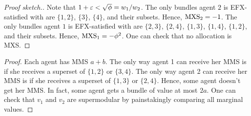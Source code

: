 \begin{proof}[Proof sketch.]
Note that $1 + \varepsilon < \sqrt{\phi} = w_1/w_2$.
The only bundles agent $2$ is EFX-satisfied with are
$\{1, 2\}$, $\{3\}$, $\{4\}$, and their subsets.
Hence, $\mathrm{MXS}_2 = -1$.
%
The only bundles agent $1$ is EFX-satisfied with are
$\{2, 3\}$, $\{2, 4\}$, $\{1, 3\}$, $\{1, 4\}$, $\{1, 2\}$, and their subsets.
Hence, $\mathrm{MXS}_1 = -\phi^2$.
%
One can check that no allocation is MXS.
\end{proof}

\begin{proof}
Each agent has MMS $a+b$.
The only way agent 1 can receive her MMS is if she receives a superset of $\{1, 2\}$ or $\{3, 4\}$.
The only way agent 2 can receive her MMS is if she receives a superset of $\{1, 3\}$ or $\{2, 4\}$.
Hence, some agent doesn't get her MMS. In fact, some agent gets a bundle of value at most $2a$.
One can check that $v_1$ and $v_2$ are supermodular by painstakingly comparing all marginal values.
\end{proof}

